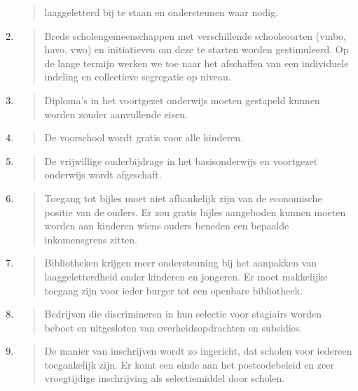 \begin{enumerate}
\begin{quote}
  laaggeletterd bij te staan en ondersteunen waar nodig.
  \end{quote}
\item
  \begin{quote}
  Brede scholengemeenschappen met verschillende schoolsoorten (vmbo,
  havo, vwo) en initiatieven om deze te starten worden gestimuleerd. Op
  de lange termijn werken we toe naar het afschaffen van een individuele
  indeling en collectieve segregatie op niveau.
  \end{quote}
\item
  \begin{quote}
  Diploma's in het voortgezet onderwijs moeten gestapeld kunnen worden
  zonder aanvullende eisen.
  \end{quote}
\item
  \begin{quote}
  De voorschool wordt gratis voor alle kinderen.
  \end{quote}
\item
  \begin{quote}
  De vrijwillige ouderbijdrage in het basisonderwijs en voortgezet
  onderwijs wordt afgeschaft.
  \end{quote}
\item
  \begin{quote}
  Toegang tot bijles moet niet afhankelijk zijn van de economische
  positie van de ouders. Er zou gratis bijles aangeboden kunnen moeten
  worden aan kinderen wiens ouders beneden een bepaalde inkomensgrens
  zitten.
  \end{quote}
\item
  \begin{quote}
  Bibliotheken krijgen meer ondersteuning bij het aanpakken van
  laaggeletterdheid onder kinderen en jongeren. Er moet makkelijke
  toegang zijn voor ieder burger tot een openbare bibliotheek.
  \end{quote}
\item
  \begin{quote}
  Bedrijven die discrimineren in hun selectie voor stagiairs worden
  beboet en uitgesloten van overheidsopdrachten en subsidies.
  \end{quote}
\item
  \begin{quote}
  De manier van inschrijven wordt zo ingericht, dat scholen voor
  iedereen toegankelijk zijn. Er komt een einde aan het postcodebeleid
  en zeer vroegtijdige inschrijving als selectiemiddel door scholen.
  \end{quote}
\end{enumerate}

